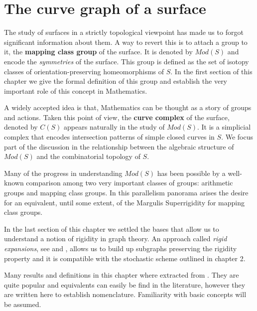 
\chapter{The curve graph of a surface} %

\label{Chapter1} %



The study of surfaces in a strictly topological viewpoint has made us to forgot significant information about them. A way to revert this is to attach a group to it, the \textbf{mapping class group} of the surface. It is denoted by $Mod(S)$ and encode the \textit{symmetries} of the surface. This group is defined as the set of isotopy classes of orientation-preserving homeomorphisms of $S$. In the first section of this chapter we give the formal definition of this group and establish the very important role of this concept in Mathematics. 

A widely accepted idea is that, Mathematics can be thought as a story of groups and actions. Taken this point of view, the \textbf{curve complex} of the surface, denoted by $C(S)$ appears naturally in the study of $Mod(S)$. It is a simplicial complex that encodes intersection patterns of simple closed curves in $S$. We focus part of the discussion in the relationship between the algebraic structure of $Mod(S)$ and the combinatorial topology of $S$.

Many of the progress in understanding $Mod(S)$ has been possible by a well-known comparison among two very important classes of groups: arithmetic groups and mapping class groups. In this parallelism panorama arises the desire for an equivalent, until some extent, of the Margulis Superrigidity for mapping class groups.

In the last section of this chapter we settled the bases that allow us to understand a notion of rigidity in graph theory. An approach called \textit{rigid expansions}, see \cite[Aramayona 16]{rigidExpJA} and \cite[Hernandez 16]{rigidExpJH}, allows us to build up subgraphs preserving the rigidity property and it is compatible with the stochastic scheme outlined in chapter 2.
 
Many results and definitions in this chapter where extracted from \cite[Farb]{Farb}. They are quite popular and equivalents can easily be find in the literature, however they are written here to establish nomenclature. Familiarity with basic concepts will be assumed.

